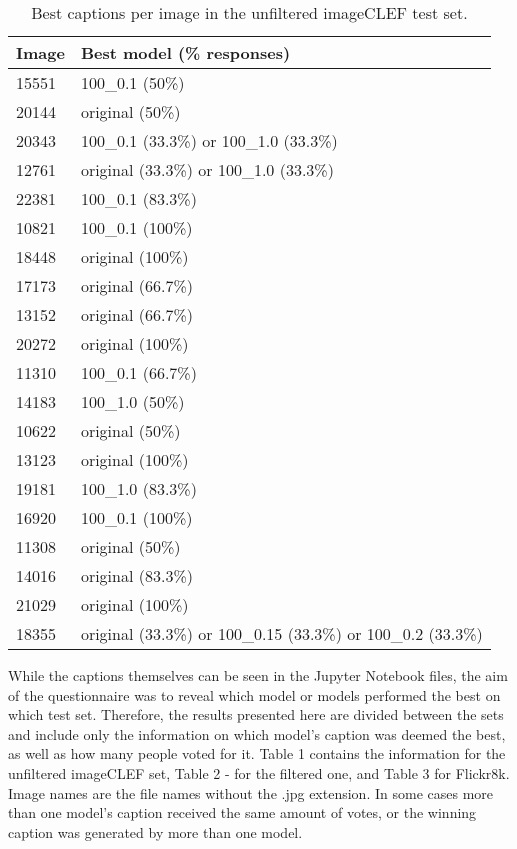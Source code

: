 \documentclass[11pt]{article}
\begin{document}
\begin{table}[h]
\begin{center}
\begin{tabular}{|p{1cm}|p{4.5cm}|}
\hline \bf Image & \bf Best model (\% responses) \\ \hline
15551 & 100\_0.1 (50\%)  \\
20144 & original (50\%)  \\
20343 & 100\_0.1 (33.3\%) or 100\_1.0 (33.3\%)  \\
12761 & original (33.3\%) or 100\_1.0 (33.3\%)  \\
22381 & 100\_0.1 (83.3\%) \\
10821 & 100\_0.1 (100\%) \\
18448 & original (100\%) \\
17173 & original (66.7\%) \\
13152 & original (66.7\%)  \\
20272 & original (100\%)  \\
11310 & 100\_0.1 (66.7\%)  \\
14183 & 100\_1.0 (50\%)  \\
10622 & original (50\%)  \\
13123 & original (100\%)   \\
19181 & 100\_1.0 (83.3\%) \\
16920 & 100\_0.1 (100\%) \\
11308 & original (50\%) \\
14016 & original (83.3\%) \\
21029 & original (100\%) \\
18355 & original (33.3\%) or 100\_0.15 (33.3\%) or 100\_0.2 (33.3\%) \\
\hline
\end{tabular}
\end{center}
\caption{\label{unfiltered-table} Best captions per image in the unfiltered imageCLEF test set. }
\end{table}

While the captions themselves can be seen in the Jupyter Notebook files, the aim of the questionnaire was to reveal which model or models performed the best on which test set. Therefore, the results presented here are divided between the sets and include only the information on which model's caption was deemed the best, as well as how many people voted for it. Table 1 contains the information for the unfiltered imageCLEF set, Table 2 - for the filtered one, and Table 3 for Flickr8k. Image names are the file names without the .jpg extension. In some cases more than one model's caption received the same amount of votes, or the winning caption was generated by more than one model. 
\end{document}
